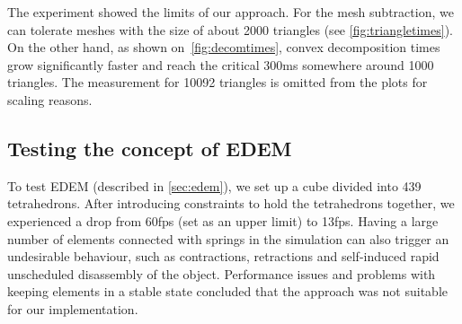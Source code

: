 The experiment showed the limits of our approach. For the mesh subtraction, we can tolerate meshes with the size of about 2000 triangles (see \cref{fig:triangletimes}).  On the other hand, as shown on~\cref{fig:decomtimes}, convex decomposition times grow significantly faster and reach the critical 300ms somewhere around 1000 triangles. The measurement for 10092 triangles is omitted from the plots for scaling reasons.


\subsection{Testing the concept of EDEM}
To test EDEM (described in \cref{sec:edem}), we set up a cube divided into 439 tetrahedrons. After introducing constraints to hold the tetrahedrons together, we experienced a drop from 60fps (set as an upper limit) to 13fps. Having a large number of elements connected with springs in the simulation can also trigger an undesirable behaviour, such as contractions, retractions and self-induced rapid unscheduled disassembly of the object. Performance issues and problems with keeping elements in a stable state concluded that the approach was not suitable for our implementation.




